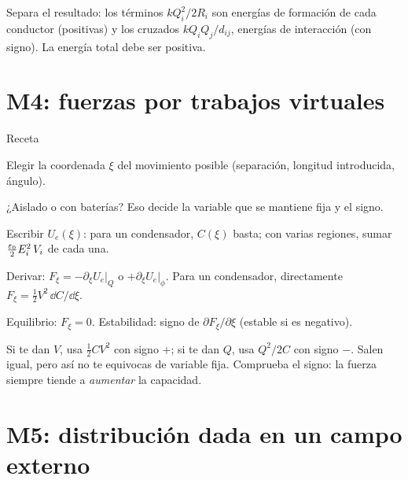 \begin{consejo}
Separa el resultado: los términos $kQ_i^2/2R_i$ son energías de formación de cada conductor (positivas) y los cruzados $kQ_iQ_j/d_{ij}$, energías de
interacción (con signo). La energía total debe ser positiva.
\end{consejo}

\section{M4: fuerzas por trabajos virtuales}\label{gsec:m4}

\begin{metodo}{Receta}
\begin{pasos}
  \item Elegir la coordenada $\xi$ del movimiento posible (separación, longitud introducida, ángulo).
  \item ¿Aislado o con baterías? Eso decide la variable que se mantiene fija y el signo.
  \item Escribir $U_e(\xi)$: para un condensador, $C(\xi)$ basta; con varias regiones, sumar $\frac{\varepsilon_0}{2}E_i^2\,V_i$ de cada una.
  \item Derivar: $F_\xi=-\partial_\xi U_e|_Q$ o $+\partial_\xi U_e|_\phi$. Para un condensador, directamente $F_\xi=\frac12V^2\,\dd C/\dd\xi$.
  \item Equilibrio: $F_\xi=0$. Estabilidad: signo de $\partial F_\xi/\partial\xi$ (estable si es negativo).
\end{pasos}
\end{metodo}

\begin{consejo}
Si te dan $V$, usa $\frac12CV^2$ con signo $+$; si te dan $Q$, usa $Q^2/2C$ con signo $-$. Salen igual, pero así no te equivocas de variable fija. Comprueba el signo:
la fuerza siempre tiende a \emph{aumentar} la capacidad.
\end{consejo}

\section{M5: distribución dada en un campo externo}\label{gsec:m5}

